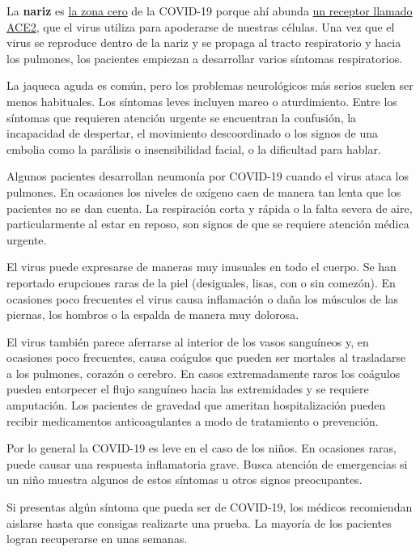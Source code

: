 La \textbf{nariz} es
\href{https://www.nature.com/articles/s41591-020-0868-6}{la zona cero}
de la COVID-19 porque ahí abunda
\href{https://www.nytimes3xbfgragh.onion/es/2020/06/03/espanol/misterios-coronavirus.html}{un
receptor llamado ACE2}, que el virus utiliza para apoderarse de nuestras
células. Una vez que el virus se reproduce dentro de la nariz y se
propaga al tracto respiratorio y hacia los pulmones, los pacientes
empiezan a desarrollar varios síntomas respiratorios.

La jaqueca aguda es común, pero los problemas neurológicos más serios
suelen ser menos habituales. Los síntomas leves incluyen mareo o
aturdimiento. Entre los síntomas que requieren atención urgente se
encuentran la confusión, la incapacidad de despertar, el movimiento
descoordinado o los signos de una embolia como la parálisis o
insensibilidad facial, o la dificultad para hablar.

Algunos pacientes desarrollan neumonía por COVID-19 cuando el virus
ataca los pulmones. En ocasiones los niveles de oxígeno caen de manera
tan lenta que los pacientes no se dan cuenta. La respiración corta y
rápida o la falta severa de aire, particularmente al estar en reposo,
son signos de que se requiere atención médica urgente.

El virus puede expresarse de maneras muy inusuales en todo el cuerpo. Se
han reportado erupciones raras de la piel (desiguales, lisas, con o sin
comezón). En ocasiones poco frecuentes el virus causa inflamación o daña
los músculos de las piernas, los hombros o la espalda de manera muy
dolorosa.

El virus también parece aferrarse al interior de los vasos sanguíneos y,
en ocasiones poco frecuentes, causa coágulos que pueden ser mortales al
trasladarse a los pulmones, corazón o cerebro. En casos extremadamente
raros los coágulos pueden entorpecer el flujo sanguíneo hacia las
extremidades y se requiere amputación. Los pacientes de gravedad que
ameritan hospitalización pueden recibir medicamentos anticoagulantes a
modo de tratamiento o prevención.

Por lo general la COVID-19 es leve en el caso de los niños. En ocasiones
raras, puede causar una respuesta inflamatoria grave. Busca atención de
emergencias si un niño muestra algunos de estos síntomas u otros signos
preocupantes.

Si presentas algún síntoma que pueda ser de COVID-19, los médicos
recomiendan aislarse hasta que consigas realizarte una prueba. La
mayoría de los pacientes logran recuperarse en unas semanas.

